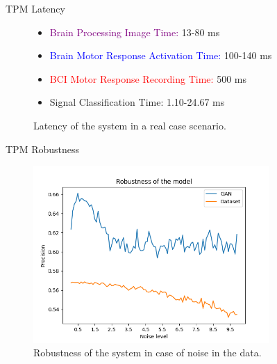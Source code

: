 \begin{frame}{TPM \textemdash{} Latency}
\begin{figure}[!htbp]
{
        }
        \begin{itemize}
            \item \textcolor{purple}{Brain Processing Image Time:} 13-80 ms
            \item \textcolor{blue}{Brain Motor Response Activation Time:} 100-140 ms
            \item \textcolor{red}{BCI Motor Response Recording Time:} 500 ms
            \item \textcolor{amethyst}{Signal Classification Time:} 1.10-24.67 ms
        \end{itemize}
        \caption{Latency of the system in a real case scenario.}\label{fig:latency}
    \end{figure}
\end{frame}
\begin{frame}{TPM \textemdash{} Robustness}
    \begin{figure}[!htbp]
        \centering
        \includegraphics[width=0.8\textwidth]{figures/Testing/robustness_plot}
        \caption{Robustness of the system in case of noise in the data.}\label{fig:robustness}
    \end{figure}
\end{frame}
